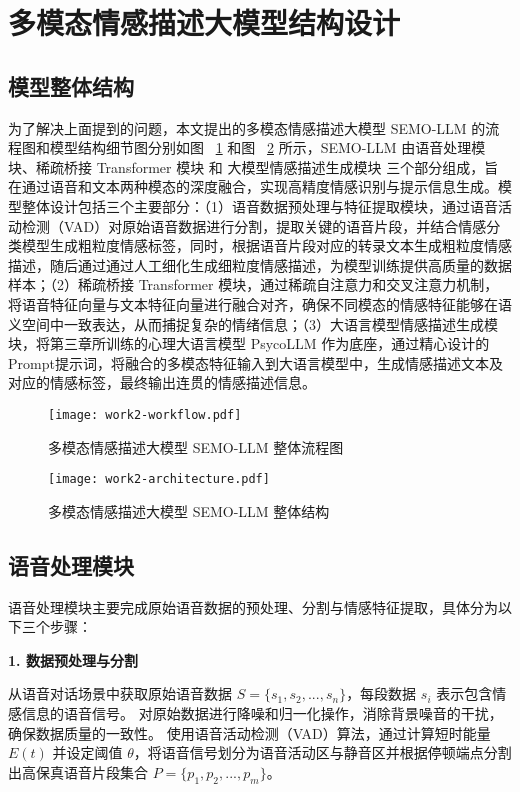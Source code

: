 \section{多模态情感描述大模型结构设计}

\subsection{模型整体结构}

为了解决上面提到的问题，本文提出的多模态情感描述大模型 SEMO-LLM 的流程图和模型结构细节图分别如图 ~\ref{fig:work2-workflow} 和图 ~\ref{fig:work2-architecture} 所示，SEMO-LLM 由语音处理模块、稀疏桥接 Transformer 模块 和 大模型情感描述生成模块 三个部分组成，旨在通过语音和文本两种模态的深度融合，实现高精度情感识别与提示信息生成。模型整体设计包括三个主要部分：（1）语音数据预处理与特征提取模块，通过语音活动检测（VAD）对原始语音数据进行分割，提取关键的语音片段，并结合情感分类模型生成粗粒度情感标签，同时，根据语音片段对应的转录文本生成粗粒度情感描述，随后通过通过人工细化生成细粒度情感描述，为模型训练提供高质量的数据样本；（2）稀疏桥接 Transformer 模块，通过稀疏自注意力和交叉注意力机制，将语音特征向量与文本特征向量进行融合对齐，确保不同模态的情感特征能够在语义空间中一致表达，从而捕捉复杂的情绪信息；（3）大语言模型情感描述生成模块，将第三章所训练的心理大语言模型 PsycoLLM 作为底座，通过精心设计的Prompt提示词，将融合的多模态特征输入到大语言模型中，生成情感描述文本及对应的情感标签，最终输出连贯的情感描述信息。

\begin{figure}[ht]
  \centering
  \texttt{[image: work2-workflow.pdf]}
  \caption{多模态情感描述大模型 SEMO-LLM 整体流程图}
  \label{fig:work2-workflow}
\end{figure}

\begin{figure}[ht]
  \centering
  \texttt{[image: work2-architecture.pdf]}
  \caption{多模态情感描述大模型 SEMO-LLM 整体结构}
  \label{fig:work2-architecture}
\end{figure}

\subsection{语音处理模块}

语音处理模块主要完成原始语音数据的预处理、分割与情感特征提取，具体分为以下三个步骤：

\textbf{1. 数据预处理与分割}

从语音对话场景中获取原始语音数据 $S = \{s_1, s_2, ..., s_n\}$，每段数据 $s_i$ 表示包含情感信息的语音信号。
对原始数据进行降噪和归一化操作，消除背景噪音的干扰，确保数据质量的一致性。
使用语音活动检测（VAD）算法，通过计算短时能量 $E(t)$ 并设定阈值 $\theta$，将语音信号划分为语音活动区与静音区并根据停顿端点分割出高保真语音片段集合 $P = \{p_1, p_2, ..., p_m\}$。  

